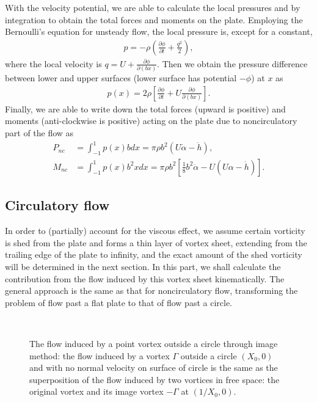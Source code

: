 With the velocity potential, we are able to calculate the local pressures and by integration to obtain the total forces and moments on the plate.
Employing the Bernoulli's equation for unsteady flow, the local pressure is, except for a constant,
\begin{align}
p = -\rho (\frac{\partial \phi}{\partial t} + \frac{q^2}{2}),
\end{align} 
where the local velocity is $q = U + \frac{\partial \phi}{\partial (bx)}$.
Then we obtain the pressure difference between lower and upper surfaces (lower surface has potential $-\phi$) at $x$ as
\begin{align}
p(x) = 2 \rho [\frac{\partial \phi}{\partial t} + U\frac{\partial \phi}{\partial (bx)}].
\end{align} 
Finally, we are able to write down the total forces (upward is positive) and moments (anti-clockwise is positive) acting on the plate due to noncirculatory part of the flow as
\begin{align}
P_{nc} & = \int^{1}_{-1} p(x)bdx
   = \pi\rho b^2(U\dot{\alpha} - \ddot{h}),   \\
M_{nc} & = \int^{1}_{-1} p(x)b^2xdx
   = \pi\rho b^2[\frac{1}{8}b^2\ddot{\alpha} - U(U\alpha - \dot{h})].
\end{align}


\subsection{Circulatory flow}

In order to (partially) account for the viscous effect, we assume certain vorticity is shed from the plate and forms a thin layer of vortex sheet, extending from the trailing edge of the plate to infinity, and the exact amount of the shed vorticity will be determined in the next section.
In this part, we shall calculate the contribution from the flow induced by this vortex sheet kinematically.
The general approach is the same as that for noncirculatory flow, transforming the problem of flow past a flat plate to that of flow past a circle.

\begin{figure}
 \centering
 \noindent \\
 
\caption[The flow induced by a point vortex outside a circle through image method]{The flow induced by a point vortex outside a circle through image method: the flow induced by a vortex $\Gamma$ outside a circle $(X_0, 0)$ and with no normal velocity on surface of circle is the same as the superposition of the flow induced by two vortices in free space: the original vortex and its image vortex $-\Gamma$ at $(1/X_0, 0)$.}
\label{fig:ImageMethod}
\end{figure}

